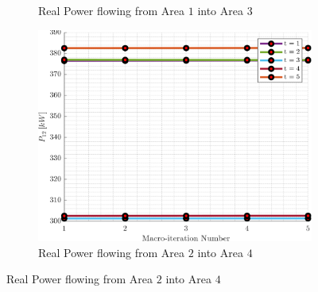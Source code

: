 \documentclass[../../outputs/main.tex]{subfiles}
\begin{document}
\begin{figure}[h!]
\begin{subfigure}[b]{0.3\textwidth}
        \caption{\scriptsize Real Power flowing from Area $1$ into Area $3$}
        \label{fig:real_power_1_3}
    \end{subfigure}
    \hfill
    \begin{subfigure}[b]{0.3\textwidth}
        \centering
        \includegraphics[width=\textwidth]{../figures/T5-pv20-batt30-genCost/dopf/convergenceCurves/BoundaryRealPower_vs_t_vs_macroItr_T_5_Areas_2_4_genCost_pv_20_batt_30_crop.png}
        \caption{\scriptsize Real Power flowing from Area $2$ into Area $4$}
        \label{fig:real_power_2_4}
    \end{subfigure}
    

\end{figure}
\end{document}
